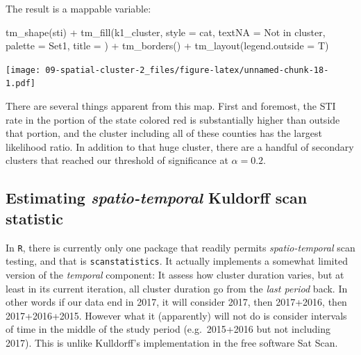 \documentclass[
]{book}
\newenvironment{Shaded}{\begin{snugshade}}{\end{snugshade}}
\newcommand{\AttributeTok}[1]{\textcolor[rgb]{0.77,0.63,0.00}{#1}}
\newcommand{\FunctionTok}[1]{\textcolor[rgb]{0.00,0.00,0.00}{#1}}
\newcommand{\NormalTok}[1]{#1}
\newcommand{\SpecialCharTok}[1]{\textcolor[rgb]{0.00,0.00,0.00}{#1}}
\newcommand{\StringTok}[1]{\textcolor[rgb]{0.31,0.60,0.02}{#1}}
\begin{document}
The result is a mappable variable:

\begin{Shaded}
\begin{Highlighting}[]
\FunctionTok{tm\_shape}\NormalTok{(sti) }\SpecialCharTok{+}
  \FunctionTok{tm\_fill}\NormalTok{(}\StringTok{\textquotesingle{}k1\_cluster\textquotesingle{}}\NormalTok{,}
          \AttributeTok{style =} \StringTok{\textquotesingle{}cat\textquotesingle{}}\NormalTok{,}
          \AttributeTok{textNA =} \StringTok{\textquotesingle{}Not in cluster\textquotesingle{}}\NormalTok{,}
          \AttributeTok{palette =} \StringTok{\textquotesingle{}Set1\textquotesingle{}}\NormalTok{,}
          \AttributeTok{title =} \StringTok{\textquotesingle{}\textquotesingle{}}\NormalTok{) }\SpecialCharTok{+} 
  \FunctionTok{tm\_borders}\NormalTok{() }\SpecialCharTok{+} 
  \FunctionTok{tm\_layout}\NormalTok{(}\AttributeTok{legend.outside =}\NormalTok{ T)}
\end{Highlighting}
\end{Shaded}

\texttt{[image: 09-spatial-cluster-2\_files/figure-latex/unnamed-chunk-18-1.pdf]}

There are several things apparent from this map. First and foremost, the STI rate in the portion of the state colored red is substantially higher than outside that portion, and the cluster including all of these counties has the largest likelihood ratio. In addition to that huge cluster, there are a handful of secondary clusters that reached our threshold of significance at \(\alpha = 0.2\).

\hypertarget{estimating-spatio-temporal-kuldorff-scan-statistic}{%
\subsection{\texorpdfstring{Estimating \emph{spatio-temporal} Kuldorff scan statistic}{Estimating spatio-temporal Kuldorff scan statistic}}\label{estimating-spatio-temporal-kuldorff-scan-statistic}}

In \texttt{R}, there is currently only one package that readily permits \emph{spatio-temporal} scan testing, and that is \texttt{scanstatistics}. It actually implements a somewhat limited version of the \emph{temporal} component: It assess how cluster duration varies, but at least in its current iteration, all cluster duration go from the \emph{last period} back. In other words if our data end in 2017, it will consider 2017, then 2017+2016, then 2017+2016+2015. However what it (apparently) will not do is consider intervals of time in the middle of the study period (e.g.~2015+2016 but not including 2017). This is unlike Kulldorff's implementation in the free software Sat Scan.
\end{document}
